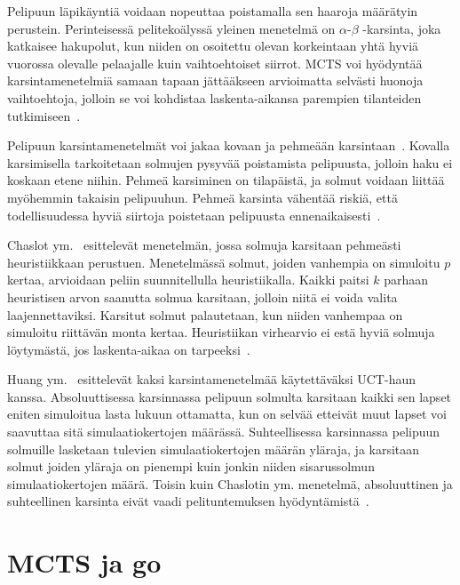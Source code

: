 \documentclass[12pt,finnish]{tktltiki2}
\theoremstyle{definition}
\theoremstyle{remark}
\begin{document}
Pelipuun läpikäyntiä voidaan nopeuttaa poistamalla sen haaroja määrätyin perustein. Perinteisessä pelitekoälyssä yleinen menetelmä on $\alpha$-$\beta$ -karsinta, joka katkaisee hakupolut, kun niiden on osoitettu olevan korkeintaan yhtä hyviä vuorossa olevalle pelaajalle kuin vaihtoehtoiset siirrot. MCTS voi hyödyntää karsintamenetelmiä samaan tapaan jättääkseen arvioimatta selvästi huonoja vaihtoehtoja, jolloin se voi kohdistaa laskenta-aikansa parempien tilanteiden tutkimiseen~\cite{browne}.

Pelipuun karsintamenetelmät voi jakaa kovaan ja pehmeään karsintaan~\cite{browne}. Kovalla karsimisella tarkoitetaan solmujen pysyvää poistamista pelipuusta, jolloin haku ei koskaan etene niihin. Pehmeä karsiminen on tilapäistä, ja solmut voidaan liittää myöhemmin takaisin pelipuuhun. Pehmeä karsinta vähentää riskiä, että todellisuudessa hyviä siirtoja poistetaan pelipuusta ennenaikaisesti~\cite{browne}.

Chaslot ym.~\cite{chaslotprune} esittelevät menetelmän, jossa solmuja karsitaan pehmeästi heuristiikkaan perustuen. Menetelmässä solmut, joiden vanhempia on simuloitu $p$ kertaa, arvioidaan peliin suunnitellulla heuristiikalla. Kaikki paitsi $k$ parhaan heuristisen arvon saanutta solmua karsitaan, jolloin niitä ei voida valita laajennettaviksi. Karsitut solmut palautetaan, kun niiden vanhempaa on simuloitu riittävän monta kertaa. Heuristiikan virhearvio ei estä hyviä solmuja löytymästä, jos laskenta-aikaa on tarpeeksi~\cite{browne}.

Huang ym.~\cite{huangprune} esittelevät kaksi karsintamenetelmää käytettäväksi UCT-haun kanssa. Absoluuttisessa karsinnassa pelipuun solmulta karsitaan kaikki sen lapset eniten simuloitua lasta lukuun ottamatta, kun on selvää etteivät muut lapset voi saavuttaa sitä simulaatiokertojen määrässä. Suhteellisessa karsinnassa pelipuun solmuille lasketaan tulevien simulaatiokertojen määrän yläraja, ja karsitaan solmut joiden yläraja on pienempi kuin jonkin niiden sisarussolmun simulaatiokertojen määrä. Toisin kuin Chaslotin ym. menetelmä, absoluuttinen ja suhteellinen karsinta eivät vaadi pelituntemuksen hyödyntämistä~\cite{huangprune}.


\section{MCTS ja go}
\end{document}

